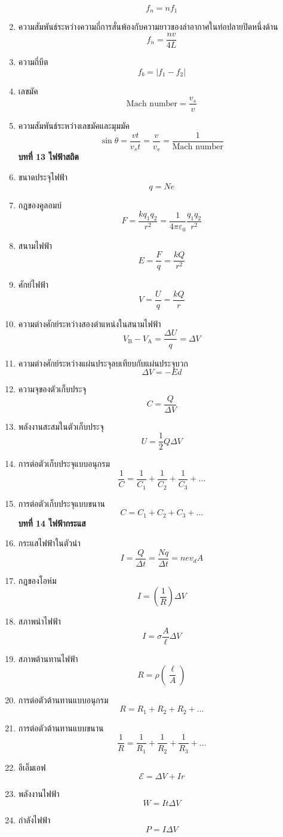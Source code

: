 \documentclass[12pt, a4paper]{article}
\begin{document}
\begin{enumerate}
		\[f_n=nf_1\]
	\item ความสัมพันธ์ระหว่างความถี่การสั่นพ้องกับความยาวของลำอากาศในท่อปลายปิดหนึ่งด้าน
		\[f_n=\frac{nv}{4L}\]
	\item ความถี่บีต
		\[f_b=|f_1-f_2|\]
	\item เลขมัค
		\[\text{Mach number}=\frac{v_s}{v}\]
	\item ความสัมพันธ์ระหว่างเลขมัคและมุมมัค
		\[\sin\theta=\frac{vt}{v_s t}=\frac{v}{v_s}=\frac{1}{\text{Mach number}}\]
	\textbf{บทที่ 13 ไฟฟ้าสถิต}
	\item ขนาดประจุไฟฟ้า
		\[q=Ne\]
	\item กฎของคูลอมบ์
		\[F=\frac{kq_1q_2}{r^2}=\frac{1}{4\pi\varepsilon_0}\frac{q_1q_2}{r^2}\]
	\item สนามไฟฟ้า
		\[E=\frac{F}{q}=\frac{kQ}{r^2}\]
	\item ศักย์ไฟฟ้า
		\[V=\frac{U}{q}=\frac{kQ}{r}\]
	\item ความต่างศักย์ระหว่างสองตำแหน่งในสนามไฟฟ้า
		\[V_\text{B}-V_\text{A}=\frac{\Delta U}{q}=\Delta V\]
	\item ความต่างศักย์ระหว่างแผ่นประจุลบเทียบกับแผ่นประจุบวก
		\[\Delta V=-Ed\]
	\item ความจุของตัวเก็บประจุ
		\[C=\frac{Q}{\Delta V}\]
	\item พลังงานสะสมในตัวเก็บประจุ
		\[U=\frac{1}{2}Q\Delta V\]
	\item การต่อตัวเก็บประจุแบบอนุกรม
		\[\frac{1}{C}=\frac{1}{C_1}+\frac{1}{C_2}+\frac{1}{C_3}+\dots\]
	\item การต่อตัวเก็บประจุแบบขนาน
		\[C=C_1+C_2+C_3+\dots\]
	\textbf{บทที่ 14 ไฟฟ้ากระแส}
	\item กระแสไฟฟ้าในตัวนำ
		\[I=\frac{Q}{\Delta t}=\frac{Nq}{\Delta t}=nev_dA\]
	\item กฎของโอห์ม
		\[I=\left( \frac{1}{R}\right) \Delta V\]
	\item สภาพนำไฟฟ้า
		\[I=\sigma\frac{A}{\ell}\Delta V\]
	\item สภาพต้านทานไฟฟ้า
		\[R=\rho\left( \frac{\ell}{A}\right) \]
	\item การต่อตัวต้านทานแบบอนุกรม
		\[R=R_1+R_2+R_2+\dots\]
	\item การต่อตัวต้านทานแบบขนาน
		\[\frac{1}{R}=\frac{1}{R_1}+\frac{1}{R_2}+\frac{1}{R_3}+\dots\]
	\item อีเอ็มเอฟ
		\[\mathcal{E}=\Delta V+Ir\]
	\item พลังงานไฟฟ้า
		\[W=It\Delta V\]
	\item กำลังไฟฟ้า
		\[P=I\Delta V\]
	\begin{center}

\end{center}
\end{enumerate}
\end{document}
